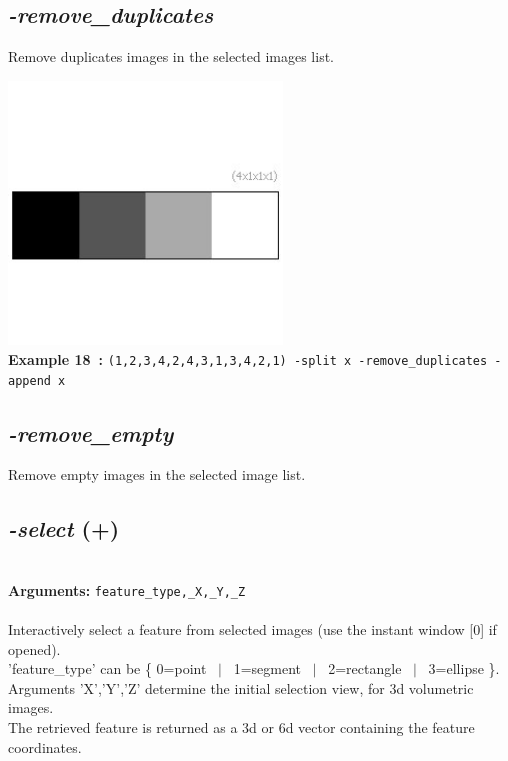 \documentclass[a4paper,11pt,twoside]{book}
\begin{document}
\subsection{\emph{-remove\_duplicates} }\vspace*{-0.5em}
Remove duplicates images in the selected images list.
\begin{center}\includegraphics[keepaspectratio=true,height=7cm,width=\textwidth]{img/gmic_def18.jpg}\\
{\footnotesize \textbf{Example 18~:} \texttt{(1,2,3,4,2,4,3,1,3,4,2,1) -split x -remove\_duplicates -append x}}
\end{center}

\subsection{\emph{-remove\_empty} }\vspace*{-0.5em}
Remove empty images in the selected image list.


\subsection{\emph{-select} (+)}\vspace*{-0.5em}
~\\\textbf{Arguments: } 
{\small \texttt{feature\_type,\_X,\_Y,\_Z}}\\~\\
Interactively select a feature from selected images (use the instant window [0] if opened).
~\\'feature\_type' can be \{ 0=point ~$|$~ 1=segment ~$|$~ 2=rectangle ~$|$~ 3=ellipse \}.
~\\Arguments 'X','Y','Z' determine the initial selection view, for 3d volumetric images.
~\\The retrieved feature is returned as a 3d or 6d vector containing the feature coordinates.
\end{document}
